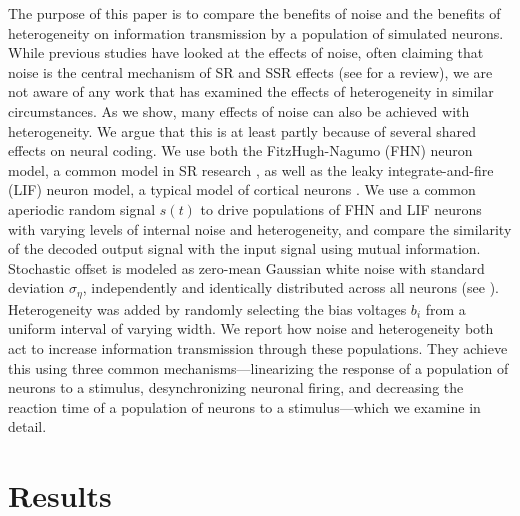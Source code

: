 \documentclass[12pt]{article}
\newcommand{\scn}[1]{\textsc{\nameref{scn:#1}}}
\newcommand{\scnlabel}[1]{\label{scn:#1}}
\begin{document}
The purpose of this paper is to compare the benefits of noise and the benefits of heterogeneity on information transmission by a population of simulated neurons. While previous studies have looked at the effects of noise, often claiming that noise is the central mechanism of SR and SSR effects \citep{Collins1995,Stocks2001} (see \cite{McDonnell2011} for a review), we are not aware of any work that has examined the effects of heterogeneity in similar circumstances. As we show, many effects of noise can also be achieved with heterogeneity. We argue that this is at least partly because of several shared effects on neural coding. We use both the FitzHugh-Nagumo (FHN) neuron model, a common model in SR research \citep{Wiesenfeld1994,Collins1995,Longtin1998,Stocks2001}, as well as the leaky integrate-and-fire (LIF) neuron model, a typical model of cortical neurons \citep{Koch1999}. We use a common aperiodic random signal $s(t)$ to drive populations of FHN and LIF neurons with varying levels of internal noise and heterogeneity, and compare the similarity of the decoded output signal with the input signal using mutual information. Stochastic offset is modeled as zero-mean Gaussian white noise with standard deviation $\sigma_\eta$, independently and identically distributed across all neurons (see \scn{methods}). Heterogeneity was added by randomly selecting the bias voltages $b_i$ from a uniform interval of varying width. We report how noise and heterogeneity both act to increase information transmission through these populations. They achieve this using three common mechanisms---linearizing the response of a population of neurons to a stimulus, desynchronizing neuronal firing, and decreasing the reaction time of a population of neurons to a stimulus---which we examine in detail.

\section{Results}
\scnlabel{results}
\end{document}
